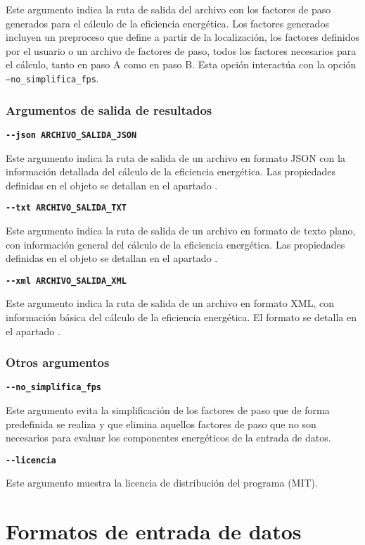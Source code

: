 \documentclass[10pt,notitlepage,oneside,a4paper]{article}
\begin{document}
Este argumento indica la ruta de salida del archivo con los factores de paso generados para el cálculo de la eficiencia energética. Los factores generados incluyen un preproceso que define a partir de la localización, los factores definidos por el usuario o un archivo de factores de paso, todos los factores necesarios para el cálculo, tanto en paso A como en paso B. Esta opción interactúa con la opción \texttt{--no\_simplifica\_fps}.

\subsubsection{Argumentos de salida de resultados}

\textbf{\texttt{-{}-json ARCHIVO\_SALIDA\_JSON}}

Este argumento indica la ruta de salida de un archivo en formato JSON con la información detallada del cálculo de la eficiencia energética. Las propiedades definidas en el objeto se detallan en el apartado .

\textbf{\texttt{-{}-txt ARCHIVO\_SALIDA\_TXT}}

Este argumento indica la ruta de salida de un archivo en formato de texto plano, con información general del cálculo de la eficiencia energética. Las propiedades definidas en el objeto se detallan en el apartado .

\textbf{\texttt{-{}-xml ARCHIVO\_SALIDA\_XML}}

Este argumento indica la ruta de salida de un archivo en formato XML, con información básica del cálculo de la eficiencia energética. El formato se detalla en el apartado .

\subsubsection{Otros argumentos}

\textbf{\texttt{-{}-no\_simplifica\_fps}}

Este argumento evita la simplificación de los factores de paso que de forma predefinida se realiza y que elimina aquellos factores de paso que no son necesarios para evaluar los componentes energéticos de la entrada de datos.

\textbf{\texttt{-{}-licencia}}

Este argumento muestra la licencia de distribución del programa (MIT).

\clearpage
\newpage
\section{Formatos de entrada de datos}
\end{document}
